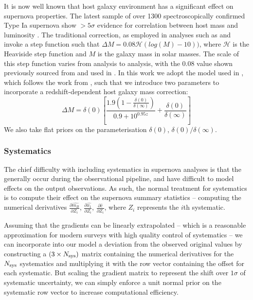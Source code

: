\documentclass[a4paper,fleqn,usenatbib]{mnras}
\newcommand{\rubin}{\citetalias{Rubin2015}}
\begin{document}
It is now well known that host galaxy environment has a significant effect on supernova properties. The latest sample of over 1300 spectroscopically confirmed Type Ia supernova show $>5\sigma$ evidence for correlation between host mass and luminosity \citep{Uddin2017}. The traditional correction, as employed in analyses such as \citet{Suzuki2012} and \citet{Betoule2014} invoke a step function such that $\Delta M = 0.08 \mathcal{H}(log(M) - 10))$, where $\mathcal{H}$ is the Heaviside step function and $M$ is the galaxy mass in solar masses. The scale of this step function varies from analysis to analysis, with the 0.08 value shown previously sourced from \cite{Sullivan2010} and used in \citet{Betoule2014}. In this work we adopt the model used in {\rubin}, which follows the work from \citet{Rigault2013}, such that we introduce two parameters to incorporate a redshift-dependent host galaxy mass correction:
\begin{equation}
\Delta M = \delta(0) \left[ \frac{1.9\left(1 - \frac{\delta(0)}{\delta(\infty)}\right)  }{0.9 + 10^{0.95z}} + \frac{\delta(0)}{\delta(\infty)}\right]
\end{equation}
We also take flat priors on the parameterisation $\delta(0)$, $\delta(0)/\delta(\infty)$.

\subsubsection{Systematics}

The chief difficulty with including systematics in supernova analyses is that the generally occur during the observational pipeline, and have difficult to model effects on the output observations. As such, the normal treatment for systematics is to compute their effect on the supernova summary statistics -- computing the numerical derivatives $\frac{\partial \hat{m_B}}{\partial Z_i}$, $\frac{\partial \hat{x_1}}{\partial Z_i}$, $\frac{\partial \hat{c}}{\partial Z_i}$, where $Z_i$ represents the $i$th systematic.

Assuming that the gradients can be linearly extrapolated -- which is a reasonable approximation for modern surveys with high quality control of systematics -- we can incorporate into our model a deviation from the observed original values by constructing a $(3 \times N_{\rm sys})$ matrix containing the numerical derivatives for the $N_{\rm sys}$ systematics and multiplying it with the row vector containing the offset for each systematic. But scaling the gradient matrix to represent the shift over $1\sigma$ of systematic uncertainty, we can simply enforce a unit normal prior on the systematic row vector to increase computational efficiency.
\end{document}
